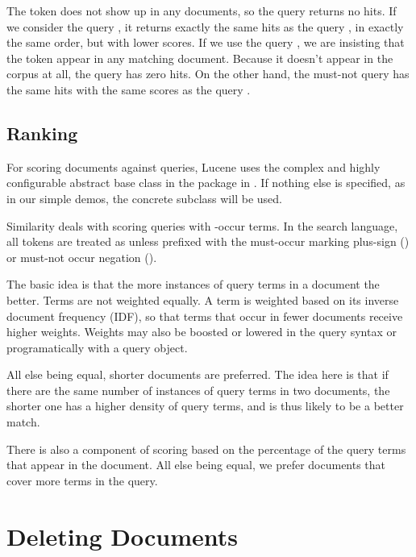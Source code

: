 The token  does not show up in any documents, so
the query  returns no hits.  If we consider the
query , it returns exactly the same hits as
the query , in exactly the same order, but with
lower scores.  If we use the query , we are
insisting that the token  appear in any matching
document.  Because it doesn't appear in the corpus at all, the query
 has zero hits.  On the other hand, the
must-not query  has the same hits with the
same scores as the query .


\subsection{Ranking}

For scoring documents against queries, Lucene uses the complex and
highly configurable abstract base class  in the
package in .  If nothing else is
specified, as in our simple demos, the concrete subclass
 will be used.

Similarity deals with scoring queries with -occur terms.
In the search language, all tokens are treated as 
unless prefixed with the must-occur marking plus-sign
(\code{+}) or must-not occur negation (\code{-}).

The basic idea is that the more instances of query terms in a document
the better.  Terms are not weighted equally.  A term is weighted based
on its inverse document frequency (IDF), so that terms that occur in
fewer documents receive higher weights.  Weights may also be boosted
or lowered in the query syntax or programatically with a query object.

All else being equal, shorter documents are preferred.  The idea here
is that if there are the same number of instances of query terms in two
documents, the shorter one has a higher density of query terms, and is
thus likely to be a better match.  

There is also a component of scoring based on the percentage of the
query terms that appear in the document.  All else being equal, we
prefer documents that cover more terms in the query.


\section{Deleting Documents}\label{section:lucene-delete}

